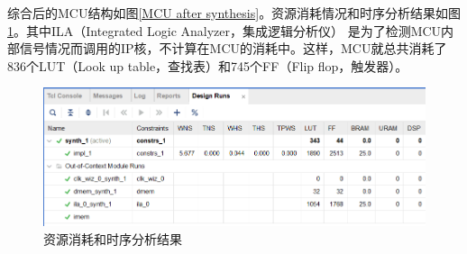 \documentclass[a4paper]{article}
\begin{document}
				综合后的MCU结构如图\ref{MCU after synthesis}。资源消耗情况和时序分析结果如图\ref{usage and timing analysis}。其中ILA（Integrated Logic Analyzer，集成逻辑分析仪）
				是为了检测MCU内部信号情况而调用的IP核，不计算在MCU的消耗中。这样，MCU就总共消耗了836个LUT（Look up table，查找表）和745个FF（Flip flop，触发器）。
				\begin{figure}[htbp]
					\centering
					\includegraphics[scale=0.45]{资源消耗和时序分析.png}
					\caption{资源消耗和时序分析结果}
					\label{usage and timing analysis}
				\end{figure}
\end{document}

